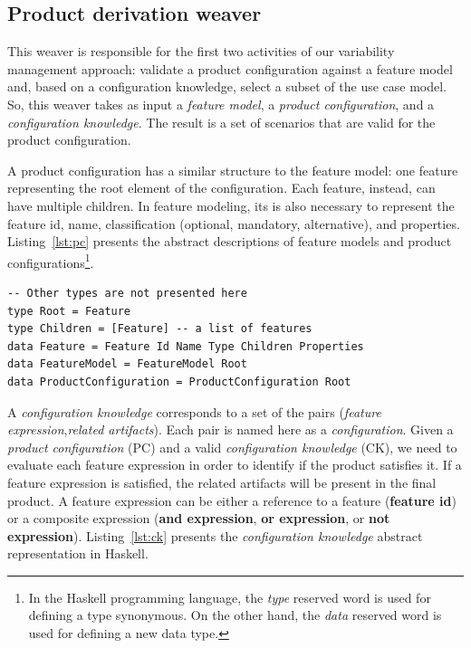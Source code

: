 \documentclass{llncs}
\begin{document}
\subsection{Product derivation weaver}\label{sub:pd-weaver}

This weaver is responsible for the first two activities of our 
variability management approach: validate a product configuration 
against  a feature model and, based on a configuration knowledge, select 
a subset of the use case model. So, this weaver takes as input a
\emph{feature model}, a \emph{product configuration}, and a \emph{configuration knowledge}.
The result is a set of scenarios that are valid for the product configuration.

A product configuration has a similar structure to the feature model:
one feature representing the root element of the configuration. Each
feature, instead, can have multiple children. In feature modeling,
its is also necessary to represent the feature id, name,
classification (optional, mandatory, alternative), and properties.
Listing~\ref{lst:pc} presents the abstract descriptions of feature models 
and product configurations\footnote{In the Haskell programming language, the
\emph{type} reserved word is used for defining a type synonymous. On
the other hand, the \emph{data }reserved word is used for defining a
new data type.}.

\begin{lstlisting}[belowskip=20pt,frame=tb,caption={Product Configuration},label=lst:pc]
-- Other types are not presented here
type Root = Feature
type Children = [Feature] -- a list of features
data Feature = Feature Id Name Type Children Properties
data FeatureModel = FeatureModel Root
data ProductConfiguration = ProductConfiguration Root
\end{lstlisting}

A \emph{configuration knowledge} corresponds 
to a set of the pairs (\emph{feature expression},\emph{related artifacts}). 
Each pair is named here as a \emph{configuration}. Given a
\emph{product configuration} (PC) and a valid \emph{configuration
knowledge} (CK), we need to evaluate each feature expression in
order to identify if the product satisfies it. If a feature
expression is satisfied, the related artifacts will be present in the
final product. A feature expression can be either a reference to a
feature ({\bf feature id}) or a composite expression ({\bf and expression}, 
{\bf or expression}, or {\bf not expression}). Listing~\ref{lst:ck}
presents the \emph{configuration knowledge} abstract representation in Haskell.
\end{document}
